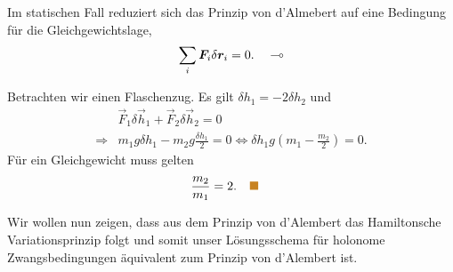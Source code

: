 \begin{bemn}
Im statischen Fall reduziert sich das Prinzip von d'Almebert auf eine Bedingung
für die Gleichgewichtslage,
\begin{align*}
\sum_i \bm{F}_i\delta\bm{r}_i = 0.\quad\multimap
\end{align*}
\end{bemn}

\begin{bsp}
Betrachten wir einen Flaschenzug.
Es gilt $\delta h_1 = -2 \delta h_2$ und
\begin{align*}
&\vec{F}_1 \delta\vec{h}_1 + \vec{F}_2\delta\vec{h}_2 = 0\\
\Rightarrow & m_1 g \delta h_1 - m_2 g \frac{\delta h_1}{2} = 0 \Leftrightarrow
 \delta h_1 g \left(m_1 - \frac{m_2}{2}\right) = 0.
 \end{align*}
Für ein Gleichgewicht muss gelten
\begin{align*}
&\frac{m_2}{m_1} = 2.\bsphere
\end{align*}
\end{bsp}

Wir wollen nun zeigen, dass aus dem Prinzip von d'Alembert das Hamiltonsche
Variationsprinzip folgt und somit unser Lösungsschema für holonome
Zwangsbedingungen äquivalent zum Prinzip von d'Alembert ist.

